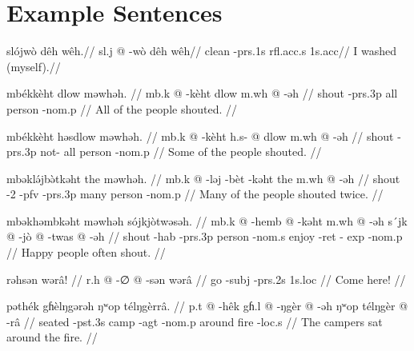 \section{Example Sentences}

\ex
\begingl
\glpreamble slójwò dêh wêh.//
\gla sl.j @ -wò dêh wêh//
\glb clean -{\sc prs}.1s {\sc rfl}.{\sc acc}.s 1s.{\sc acc}//
\glft I washed (myself).//
\endgl
\xe

\pex
\a
\begingl
\glpreamble mbékkèht dlow məwhəh. //
\gla mb.k @ -kèht dlow m.wh @ -əh //
\glb shout -{\sc prs}.3p all person -{\sc nom}.p //
\glft All of the people shouted. //
\endgl

\a
\begingl
\glpreamble mbékkèht həsdlow məwhəh. //
\gla mb.k @ -kèht h.s- @ dlow m.wh @ -əh //
\glb shout -{\sc prs}.3p not- all person -{\sc nom}.p //
\glft Some of the people shouted. //
\endgl

\a
\begingl
\glpreamble mbəklə́jbə̀tkəht the məwhəh. //
\gla mb.k @ -ləj -bèt -kəht the m.wh @ -əh //
\glb shout -2 -{\sc pfv} -{\sc prs}.3p many person -{\sc nom}.p //
\glft Many of the people shouted twice. //
\endgl

\a
\begingl
\glpreamble mbəkhəmbkəht məwhəh sójkjòtwəsəh. //
\gla mb.k @ -hemb @ -kəht m.wh @ -əh s´jk @ -jò @ -twas @ -əh //
\glb shout -{\sc hab} -{\sc prs}.3p person -{\sc nom}.s enjoy -{\sc ret} -{\sc
exp} -{\sc nom}.p //
\glft Happy people often shout. //
\endgl
\xe

\ex
\begingl
\glpreamble rəhsən wərâ! //
\gla r.h @ -∅ @ -sən wərâ //
\glb go -{\sc subj} -{\sc prs}.2s 1s.{\sc loc} //
\glft Come here! //
\endgl
\xe

\ex
\begingl
\glpreamble pəthék gɦèlŋgərəh ŋʷop télŋgèrrâ. //
\gla p.t @ -hêk gɦ.l @ -ŋgèr @ -əh ŋʷop télŋgèr @ -râ //
\glb seated -{\sc pst}.3s camp -{\sc agt} -{\sc nom}.p around fire -{\sc loc}.s
//
\glft The campers sat around the fire. //
\endgl
\xe
